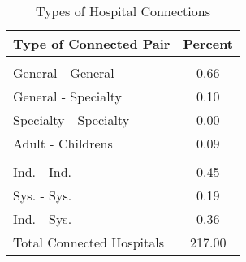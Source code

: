 \begin{table}[ht!]
\centering
\caption{Types of Hospital Connections}
\centering
\begin{tabular}[t]{lc}
\toprule
Type of Connected Pair & Percent\\
\midrule
\multicolumn{2}{l}{\textbf{ }}\\
General - General & 0.66\\
General - Specialty & 0.10\\
Specialty - Specialty & 0.00\\
\addlinespace[0.3em]
Adult - Childrens & 0.09\\
\addlinespace[0.3em]
\multicolumn{2}{l}{\textbf{ }}\\
Ind. - Ind. & 0.45\\
Sys. - Sys. & 0.19\\
Ind. - Sys. & 0.36\\
\addlinespace[0.3em]
Total Connected Hospitals & 217.00\\
\bottomrule
\end{tabular}
\end{table}
